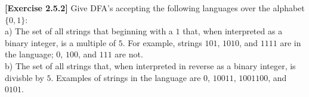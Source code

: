 \textbf{[Exercise 2.5.2]} Give DFA's accepting the following languages 
over the alphabet $\{0,1\}$:\\
a) The set of all strings that beginning with a $1$ that, when interpreted
as a binary integer, is a multiple of $5$. For example, strings $101$, 
$1010$, and $1111$ are in the language; $0$, $100$, and $111$ are not.\\
b) The set of all strings that, when interpreted in reverse as a binary 
integer, is divisble by $5$. Examples of strings in the language are $0$, 
$10011$, $1001100$, and $0101$. 
